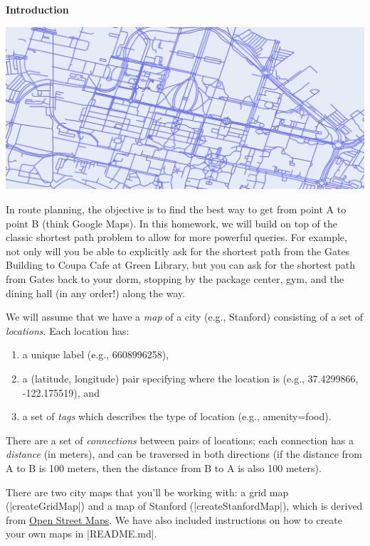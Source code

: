{\bf Introduction}

\begin{center}
    \includegraphics[width=1\textwidth]{stanford-map.png}
\end{center}

In route planning, the objective is to find the best way to get from point A to point B (think Google Maps). In this homework, we will build on top of the classic shortest path problem to allow for more powerful queries. For example, not only will you be able to explicitly ask for the shortest path from the Gates Building to Coupa Cafe at Green Library, but you can ask for the shortest path from Gates back to your dorm, stopping by the package center, gym, and the dining hall (in any order!) along the way.

We will assume that we have a \textit{map} of a city (e.g., Stanford) consisting of a set of \textit{locations}. Each location has:

\begin{enumerate}
    \item a unique label (e.g., 6608996258),
    \item a (latitude, longitude) pair specifying where the location is (e.g., 37.4299866, -122.175519), and
    \item a set of \textit{tags} which describes the type of location (e.g., amenity=food).
\end{enumerate}

There are a set of \textit{connections} between pairs of locations; each connection has a \textit{distance} (in meters), and can be traversed in both directions (if the distance from A to B is 100 meters, then the distance from B to A is also 100 meters).

There are two city maps that you'll be working with: a grid map (|createGridMap|) and a map of Stanford (|createStanfordMap|), which is derived from \href{https://www.openstreetmap.org/}{Open Street Maps}. We have also included instructions on how to create your own maps in |README.md|.
